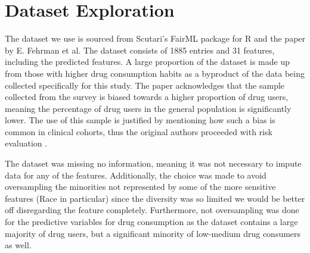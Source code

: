 \documentclass{article}
\begin{document}





\section{Dataset Exploration}
The dataset we use is sourced from Scutari's FairML package for R and the paper by E. Fehrman et al. The dataset consists of 1885 entries and 31 features, including the predicted features. A large proportion of the dataset is made up from those with higher drug consumption habits as a byproduct of the data being collected specifically for this study. The paper acknowledges that the sample collected from the survey is biased towards a higher proportion of drug users, meaning the percentage of drug users in the general population is significantly lower. The use of this sample is justified by mentioning how such a bias is common in clinical cohorts, thus the original authors proceeded with risk evaluation \cite{Fehrman}.

The dataset was missing no information, meaning it was not necessary to impute data for any of the features. Additionally, the choice was made to avoid oversampling the minorities not represented by some of the more sensitive features (Race in particular) since the diversity was so limited we would be better off disregarding the feature completely. Furthermore, not oversampling was done for the predictive variables for drug consumption as the dataset contains a large majority of drug users, but a significant minority of low-medium drug consumers as well.
\end{document}
